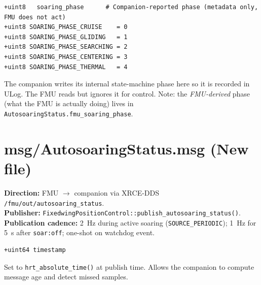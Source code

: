 \documentclass[12pt,a4paper]{article}
\begin{document}
\begin{lstlisting}[style=diff]
+uint8   soaring_phase      # Companion-reported phase (metadata only, FMU does not act)
+uint8 SOARING_PHASE_CRUISE    = 0
+uint8 SOARING_PHASE_GLIDING   = 1
+uint8 SOARING_PHASE_SEARCHING = 2
+uint8 SOARING_PHASE_CENTERING = 3
+uint8 SOARING_PHASE_THERMAL   = 4
\end{lstlisting}
\begin{annotation}The companion writes its internal state-machine phase here so it is recorded in ULog. The FMU reads but ignores it for control. Note: the \emph{FMU-derived} phase (what the FMU is actually doing) lives in \texttt{AutosoaringStatus.fmu\_soaring\_phase}.\end{annotation}

\section{msg/AutosoaringStatus.msg (New file)}

\begin{annotation}
\textbf{Direction:} FMU $\to$ companion via XRCE-DDS \texttt{/fmu/out/autosoaring\_status}.\\
\textbf{Publisher:} \texttt{FixedwingPositionControl::publish\_autosoaring\_status()}.\\
\textbf{Publication cadence:} 2~Hz during active soaring (\texttt{SOURCE\_PERIODIC}); 1~Hz for 5~s after \texttt{soar:off}; one-shot on watchdog event.
\end{annotation}

\begin{lstlisting}[style=diff]
+uint64 timestamp
\end{lstlisting}
\begin{annotation}Set to \texttt{hrt\_absolute\_time()} at publish time. Allows the companion to compute message age and detect missed samples.\end{annotation}
\end{document}
